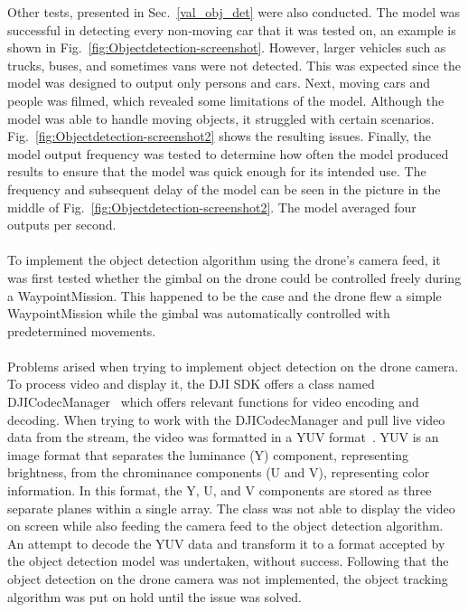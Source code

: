 Other tests, presented in Sec.~\ref{val_obj_det} were also conducted. The model was successful in detecting every non-moving car that it was tested on, an example is shown in Fig.~\ref{fig:Objectdetection-screenshot}. However, larger vehicles such as trucks, buses, and sometimes vans were not detected. This was expected since the model was designed to output only persons and cars. Next, moving cars and people was filmed, which revealed some limitations of the model. Although the model was able to handle moving objects, it struggled with certain scenarios. Fig.~\ref{fig:Objectdetection-screenshot2} shows the resulting issues. Finally, the model output frequency was tested to determine how often the model produced results to ensure that the model was quick enough for its intended use. The frequency and subsequent delay of the model can be seen in the picture in the middle of Fig.~\ref{fig:Objectdetection-screenshot2}. The model averaged four outputs per second. 
\\ \\
To implement the object detection algorithm using the drone's camera feed, it was first tested whether the gimbal on the drone could be controlled freely during a WaypointMission. This happened to be the case and the drone flew a simple WaypointMission while the gimbal was automatically controlled with predetermined movements.
\\ \\
Problems arised when trying to implement object detection on the drone camera. To process video and display it, the DJI SDK offers a class named DJICodecManager~\cite{DJIDJICodecManager} which offers relevant functions for video encoding and decoding. When trying to work with the DJICodecManager and pull live video data from the stream, the video was formatted in a YUV format~\cite{2019RGBDepacking}. YUV is an image format that separates the luminance (Y) component, representing brightness, from the chrominance components (U and V), representing color information. In this format, the Y, U, and V components are stored as three separate planes within a single array. The class was not able to display the video on screen while also feeding the camera feed to the object detection algorithm. An attempt to decode the YUV data and transform it to a format accepted by the object detection model was undertaken, without success. Following that the object detection on the drone camera was not implemented, the object tracking algorithm was put on hold until the issue was solved. 

